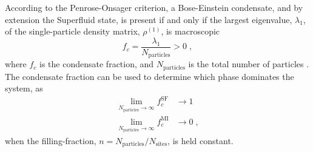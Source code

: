 According to the Penrose-Onsager criterion, a Bose-Einstein condensate, and by extension the Superfluid state, is present if and only if the largest eigenvalue, $\lambda_1$, of the single-particle density matrix, $\rho^{(1)}$, is macroscopic
\begin{equation}
	f_c = \frac{\lambda_1}{N_{\mathrm{particles}}} > 0 \; ,
	\label{eq:condensateFraction}
\end{equation} 
where $f_c$ is the condensate fraction, and $N_{\mathrm{particles}}$ is the total number of particles \cite{PenroseOnsager}. The condensate fraction can be used to determine which phase dominates the system, as
\begin{align}
	\lim_{N_{\mathrm{particles}} \to \infty} f_{c}^{\mathrm{SF}} &\to 1 \label{eq:SF_lim} \\
	\lim_{N_{\mathrm{particles}} \to \infty} f_{c}^{\mathrm{MI}} &\to 0 \; , \label{eq:MI_lim}
\end{align}
when the filling-fraction, $n = N_{\mathrm{particles}}/N_{\mathrm{sites}}$, is held constant.\\

